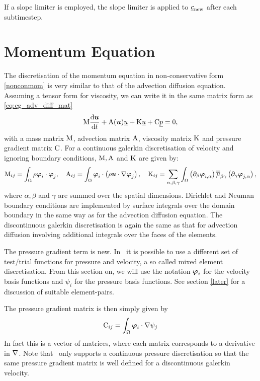If a slope limiter is employed, the slope limiter is applied to
$\underline{c}_{\mathrm{new}}$ after each subtimestep. 

\section{Momentum Equation}
\label{Sect:ND_momentum_equation}
The discretisation of the momentum equation in non-conservative 
form \eqref{nonconmom} is very similar to that of the advection 
diffusion equation. Assuming a tensor form for viscosity, we 
can write it in the same matrix form as
\eqref{eq:cg_adv_diff_mat}
\begin{equation}\label{eq:momentum_equation}
  \mathrm{M} \frac{\mathrm{d}{\mbox{\boldmath$u$}}}{\mathrm{d} t}
    +\mathrm{A}({\mbox{\boldmath$u$}})\underline{u}+\mathrm{K}\underline{ u}
    +\mathrm{C} \underline{p}
    =0,
\end{equation}
with a mass matrix $\mathrm{M}$, advection matrix $\mathrm{A}$,
viscosity matrix $\mathrm{K}$ and pressure gradient matrix $\mathrm{C}$.
For a continuous galerkin discretisation of 
velocity and ignoring boundary conditions, $\mathrm{M}, \mathrm{A}$ and $\mathrm{K}$
are given by:
\begin{equation}
  \mathrm{M}_{ij}=\int_\Omega \rho{\mbox{\boldmath$\varphi$}}_i\cdot{\mbox{\boldmath$\varphi$}}_j, \quad
  \mathrm{A}_{ij}=\int_\Omega {\mbox{\boldmath$\varphi$}}_i\cdot\left(\rho{\mbox{\boldmath$u$}}\cdot\nabla {\mbox{\boldmath$\varphi$}}_j\right), \quad
  \mathrm{K}_{ij}=\sum_{\alpha,\beta,\gamma} \int_\Omega 
    \left(\partial_\beta{\mbox{\boldmath$\varphi$}}_{i,\alpha}\right) \overline{\overline{\mu}}_{\beta\gamma}
      \left(\partial_\gamma {\mbox{\boldmath$\varphi$}}_{j,\alpha}\right),
\end{equation}
where $\alpha,\beta$ and $\gamma$ are summed over the spatial dimensions.
Dirichlet and Neuman boundary conditions are implemented by 
surface integrals over the domain boundary in the same way 
as for the advection diffusion equation. The discontinuous galerkin
discretisation is again the same as that for advection diffusion 
involving additional integrals over the faces of the elements.

The pressure gradient term is new. In \fluidity\ it is possible 
to use a different set of test/trial functions for pressure 
and velocity, a so called mixed element discretisation. From this section 
on, we will use the notation ${\mbox{\boldmath$\varphi$}}_i$ for the velocity 
basis functions and $\psi_i$ for the pressure basis functions.
See section \ref{later} for a discussion of suitable element-pairs.

The pressure gradient matrix is then simply given by
\begin{equation}
  \mathrm{C}_{ij}=\int_\Omega {\mbox{\boldmath$\varphi$}}_i\cdot\nabla\psi_j \label{pgmatrix}
\end{equation}
In fact this is a vector of matrices, where each matrix corresponds
to a derivative in $\nabla$. Note that \fluidity\ only supports
a continuous pressure discretisation so that the same 
pressure gradient matrix is well defined for a discontinuous galerkin 
velocity.

